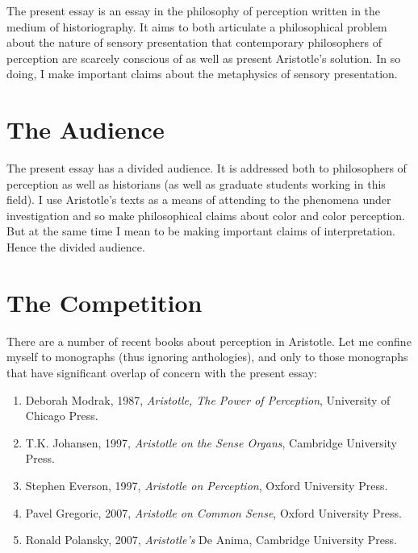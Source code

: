 \documentclass[12pt]{article}
\begin{document}
The present essay is an essay in the philosophy of perception written in the medium of historiography. It aims to both articulate a philosophical problem about the nature of sensory presentation that contemporary philosophers of perception are scarcely conscious of as well as present Aristotle's solution. In so doing, I make important claims about the metaphysics of sensory presentation.


\section{The Audience} %
\label{sec:the_audience}

The present essay has a divided audience. It is addressed both to philosophers of perception as well as historians (as well as graduate students working in this field). I use Aristotle's texts as a means of attending to the phenomena under investigation and so make philosophical claims about color and color perception. But at the same time I mean to be making important claims of interpretation. Hence the divided audience.


\section{The Competition} %
\label{sec:the_competition}

There are a number of recent books about perception in Aristotle. Let me confine myself to monographs (thus ignoring anthologies), and only to those monographs that have significant overlap of concern with the present essay:

\begin{enumerate}
	\item Deborah Modrak, 1987, \emph{Aristotle, The Power of Perception}, University of Chicago Press.
	\item T.K. Johansen, 1997, \emph{Aristotle on the Sense Organs}, Cambridge University Press.
	\item Stephen Everson, 1997, \emph{Aristotle on Perception}, Oxford University Press.
	\item Pavel Gregoric, 2007, \emph{Aristotle on Common Sense}, Oxford University Press.
	\item Ronald Polansky, 2007, \emph{Aristotle's} De Anima, Cambridge University Press.
\end{enumerate}
\end{document}
